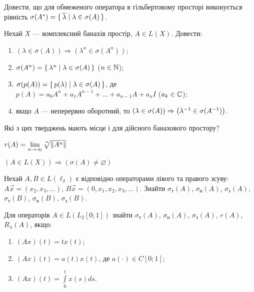 
\begin{exercise}
    Довести, що для обмеженого оператора в гільбертовому просторі виконується
    рівність $\sigma(A^{*}) = \set{\overline{\lambda} \mid \lambda \in \sigma (A)}$.
\end{exercise}

\begin{exercise}
    Нехай $X$ --- комплексний банахів простір, $A \in L(X)$. Довести:
    \begin{enumerate}
        \item $\left( \lambda \in \sigma(A)\right) \Rightarrow \left( \lambda^n \in \sigma(A^n)\right)$;
        \item $\sigma(A^n) = \set{\lambda^n \mid \lambda \in \sigma(A)}$ ($n\in \mathbb{N}$);
        \item $\sigma(p(A)) = \set{p(\lambda) \mid \lambda \in \sigma(A)}$, де $p(A) = a_0 A^n + a_1 A^{n-1} + ... + a_{n-1} A + a_n I$ ($a_k \in \mathbb{C}$);
        \item якщо $A$ --- неперервно оборотний, то $\left( \lambda \in \sigma(A)\right) \Rightarrow \left( \lambda^{-1} \in \sigma(A^{-1})\right)$.
    \end{enumerate}
    Які з цих тверджень мають місце і для дійсного банахового простору?
\end{exercise}

\begin{theory}
    \begin{theorem*}
        $r(A) = \underset{n \to \infty}{\lim} \sqrt[\leftroot{-3}\uproot{3}n]{\norm{A^n}}$
    \end{theorem*}
    \begin{theorem*}
        $\left( A \in L(X)\right) \Rightarrow (\sigma(A) \neq \varnothing)$
    \end{theorem*}
\end{theory}

\begin{exercise}
    Нехай $A, B \in L(\ell_2)$ є відповідно операторами лівого та правого зсуву:
    $A \vec{x} = (x_2, x_3, ...)$, $B\vec{x} = (0, x_1, x_2, x_3, ...)$.
    Знайти $\sigma_\text{т}(A)$, $\sigma_\text{н}(A)$, $\sigma_\text{з}(A)$,
    $\sigma_\text{т}(B)$, $\sigma_\text{н}(B)$, $\sigma_\text{з}(B)$.
\end{exercise}

\begin{exercise}
    Для операторів $A \in L(L_2 [0;1])$ знайти $\sigma_\text{т}(A)$, $\sigma_\text{н}(A)$, $\sigma_\text{з}(A)$,
    $r(A)$, $R_\lambda(A)$, якщо:
    \begin{enumerate}
        \item $(Ax)(t) = t x(t)$;
        \item $(Ax)(t) = a(t) x(t)$, де $a(\cdot) \in C[0;1]$;
        \item $(Ax)(t) = \int\limits_0^t x(s) ds$.
    \end{enumerate}
\end{exercise}

